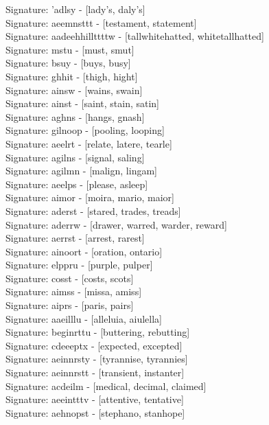 Signature: {'adlsy} - [lady's, daly's] \\
Signature: {aeemnsttt} - [testament, statement] \\
Signature: {aadeehhillttttw} - [tallwhitehatted, whitetallhatted] \\
Signature: {mstu} - [must, smut] \\
Signature: {bsuy} - [buys, busy] \\
Signature: {ghhit} - [thigh, hight] \\
Signature: {ainsw} - [wains, swain] \\
Signature: {ainst} - [saint, stain, satin] \\
Signature: {aghns} - [hangs, gnash] \\
Signature: {gilnoop} - [pooling, looping] \\
Signature: {aeelrt} - [relate, latere, tearle] \\
Signature: {agilns} - [signal, saling] \\
Signature: {agilmn} - [malign, lingam] \\
Signature: {aeelps} - [please, asleep] \\
Signature: {aimor} - [moira, mario, maior] \\
Signature: {aderst} - [stared, trades, treads] \\
Signature: {aderrw} - [drawer, warred, warder, reward] \\
Signature: {aerrst} - [arrest, rarest] \\
Signature: {ainoort} - [oration, ontario] \\
Signature: {elppru} - [purple, pulper] \\
Signature: {cosst} - [costs, scots] \\
Signature: {aimss} - [missa, amiss] \\
Signature: {aiprs} - [paris, pairs] \\
Signature: {aaeilllu} - [alleluia, aiulella] \\
Signature: {beginrttu} - [buttering, rebutting] \\
Signature: {cdeeeptx} - [expected, excepted] \\
Signature: {aeinnrsty} - [tyrannise, tyrannies] \\
Signature: {aeinnrstt} - [transient, instanter] \\
Signature: {acdeilm} - [medical, decimal, claimed] \\
Signature: {aeeintttv} - [attentive, tentative] \\
Signature: {aehnopst} - [stephano, stanhope] \\
